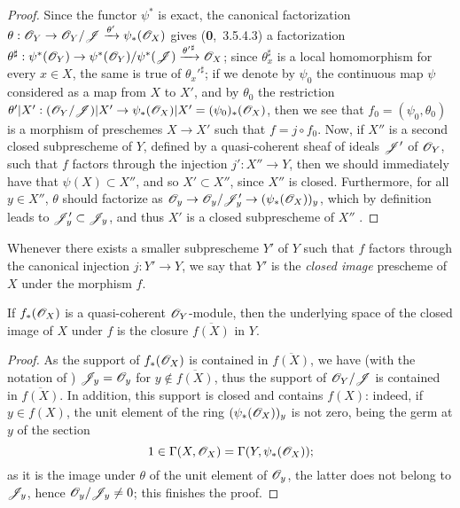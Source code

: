 \begin{proof}
\label{proof-1.9.5.2}
Since the functor $\psi^*$ is exact, the canonical factorization
$\theta:\OO_Y\to\OO_Y/\sh{J}\xrightarrow{\theta'}\psi_*(\OO_X)$ gives (\textbf{0},~3.5.4.3)
a factorization
$\theta^\sharp:\psi^*(\OO_Y)\to\psi^*(\OO_Y)/\psi^*(\sh{J})
  \xrightarrow{{\theta'}^\sharp}\OO_X$; since $\theta_x^\sharp$ is a local homomorphism for
every $x\in X$, the same is true of ${\theta_x'}^\sharp$; if we denote by $\psi_0$ the
continuous map $\psi$ considered as a map from $X$ to $X'$, and by $\theta_0$ the restriction
$\theta'|X':(\OO_Y/\sh{J})|X'\to\psi_*(\OO_X)|X'=(\psi_0)_*(\OO_X)$, then we see that
$f_0=(\psi_0,\theta_0)$ is a morphism of preschemes $X\to X'$  such that
$f=j\circ f_0$. Now, if $X''$ is
a second closed subprescheme of $Y$, defined by a quasi-coherent sheaf of ideals $\mathscr{J}'$ of
$\mathscr{O}_Y$, such that $f$ factors through the injection $j':X''\to Y$, then we should
immediately have that $\psi(X)\subset X''$, and so $X'\subset X''$, since $X''$ is closed.
Furthermore, for all $y\in X''$, $\theta$ should factorize as
$\OO_y\to\OO_y/\sh{J}'_y\to(\psi_*(\OO_X))_y$, which by definition leads to
$\mathscr{J}'_y\subset\mathscr{J}_y$, and thus $X'$ is a closed subprescheme of $X''$
.
\end{proof}

\begin{defn}[9.5.3]
\label{1.9.5.3}
Whenever there exists a smaller subprescheme $Y'$ of $Y$ such that $f$ factors
through the canonical injection $j:Y'\to Y$, we say that $Y'$ is the
\emph{closed image} prescheme of $X$ under the morphism $f$.
\end{defn}

\begin{prop}[9.5.4]
\label{1.9.5.4}
If $f_*(\mathscr{O}_X)$ is a quasi-coherent $\mathscr{O}_Y$-module, then the underlying space of
the closed image of $X$ under $f$ is the closure $\overline{f(X)}$ in $Y$.
\end{prop}

\begin{proof}
\label{proof-1.9.5.4}
As the support of $f_*(\mathscr{O}_X)$ is contained in $\overline{f(X)}$, we have (with
the notation of ) $\mathscr{J}_y=\mathscr{O}_y$ for
$y\not\in\overline{f(X)}$, thus the support of $\mathscr{O}_Y/\mathscr{J}$ is contained in
$\overline{f(X)}$. In addition, this support is closed and contains $f(X)$:
indeed, if $y\in f(X)$, the unit element of the ring $(\psi_*(\mathscr{O}_X))_y$ is not
zero, being the germ at $y$ of the section
\[
  1\in\Gamma(X,\mathscr{O}_X)=\Gamma(Y,\psi_*(\mathscr{O}_X));
\]
as it is the image under $\theta$ of the unit element of $\mathscr{O}_y$, the latter
does not belong to $\mathscr{J}_y$, hence $\mathscr{O}_y/\mathscr{J}_y\neq 0$; this finishes the
proof.
\end{proof}

